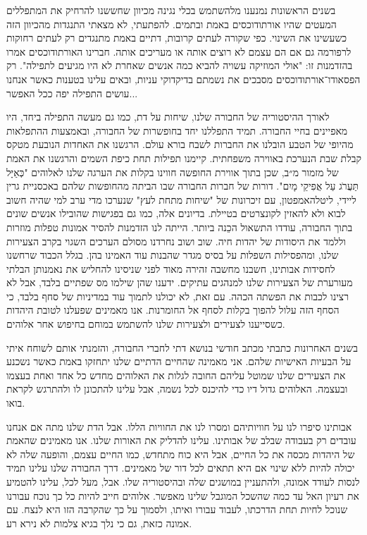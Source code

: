 \documentclass[14pt, article, extrafontsizes, twopage, a4paper]{memoir}
\begin{document}
בשנים הראשונות נמנענו מלהשתמש בכלי נגינה מכיוון שחששנו להרחיק את המתפללים המעטים שהיו אורתודוכסים באמת ובתמים. להפתעתי, לא מצאתי התנגדות מהכיוון הזה כשעשינו את השינוי. כפי שקורה לעתים קרובות, דתיים באמת מתנגדים רק לעתים רחוקות לרפורמה גם אם הם עצמם לא רוצים אותה או מעריכים אותה. חברינו האורתודוכסים אמרו בהזדמנות זו: "אולי המוזיקה עשויה להביא כמה אנשים שאחרת לא היו מגיעים לתפילה". רק הפסאודו־אורתודוכסים מסבכים את נשמתם בדיקדוקי עניות, ובאים עלינו בטענות כאשר אנחנו עושים התפילה יפה ככל האפשר...

לאורך ההיסטוריה של החבורה שלנו, שיחות על דת, כמו גם מעשה התפילה ביחד, היו מאפיינים בחיי החבורה. תמיד התפללנו יחד בחופשרות של החבורה, ובאמצעות ההתפלאות מהיופי של הטבע הובלנו את החברות לשבח בורא עולם. הרגשנו את האחדות הנובעת מטקס קבלת שבת הנערכת באווירה משפחתית. קיימנו תפילות תחת כיפת השמים והרגשנו את האמת של מזמור מ״ב, שכן בתוך אווירת החופשה חווינו בקלות את הערגה שלנו לאלוהים "כְּאַיָּל תַּעֲרֹג עַל אֲפִיקֵי מָיִם". דורות של חברות החבורה שבו הביתה מהחופשות שלהם באכסניית גרין ליידי, ליטלהאמפטון, עם זיכרונות של "שיחות מתחת לעץ" שנערכו מדי ערב למי שהיה חשוב לבוא ולא להאזין לקונצרטים בטיילת. בדיונים אלה, כמו גם בפגישות שהובילו אנשים שונים בתוך החבורה, עודדו התשאול הכֵנה ביותר. הייתה לנו הזדמנות להסיר אמונות טפלות מוזרות וללמד את היסודות של יהדות חיה. שוב ושוב נחרדנו מסולם הערכים השגוי בקרב הצעירות שלנו, ומהפסילות השפלות על בסיס מגדר שהבנות עוד האמינו בהן. בגלל הכבוד שרחשנו לחסידות אבותינו, חשבנו מחשבה זהירה מאוד לפני שניסינו להחליש את נאמנותן הבלתי מעורערת של הצעירות שלנו למנהגים עתיקים. ידענו שהן שילמו מס שפתיים בלבד, אבל לא רצינו לכבות את הפשתה הכהה. עם זאת, לא יכולנו לתמוך עוד במדיניות של סחף בלבד, כי הסחף הזה עלול להפוך בקלות לסחף אל החומרנות. אנו מאמינים שפעלנו לטובת היהדות כשסייענו לצעירים ולצעירות שלנו להשתמש במוחם בחיפוש אחר אלוהים.

בשנים האחרונות כתבתי מכתב חודשי בנושא דתי לחברי החבורה, והזמנתי אותם לשוחח איתי על הבעיות האישיות שלהם. אני מאמינה שהחיים הדתיים שלנו יתחזקו באמת כאשר נשכנע את הצעירים שלנו שמוטל עליהם החובה לגלות את האלוהים מחדש כל אחד ואחת בעצמו ובעצמה. האלוהים גדול דיו כדי להיכנס לכל נשמה, אבל עלינו להתכונן לו ולהתרגש לקראת בואו.

אבותינו סיפרו לנו על חוויותיהם ומסרו לנו את החוויות הללו. אבל הדת שלנו מתה אם אנחנו עובדים רק בעבודה שבלב של אבותינו. עלינו להדליק את האורות שלנו. אנו מאמינים שהאמת של היהדות מכסה את כל החיים, אבל היא כוח מתחדש, כמו החיים עצמם, והופעה שלה לא יכולה להיות ללא שינוי אם היא תתאים לכל דור של מאמינים. דרך החבורה שלנו עלינו תמיד לנסות לעודד אמונה, ולהתעניין במושגים שלה ובהיסטוריה שלו. אבל, מעל לכל, עלינו להטמיע את רעיון האל עד כמה שהשכל המוגבל שלינו מאפשר. אלוהים חייב להיות כל כך נוכח עבורנו שנוכל לחיות תחת הדרכתו, לעבוד עבורו ואיתו, ולסמוך על כך שהקרבה הזו היא לנצח. עם אמונה כזאת, גם כי נלך בגיא צלמות לא נירא רע.
\end{document}
